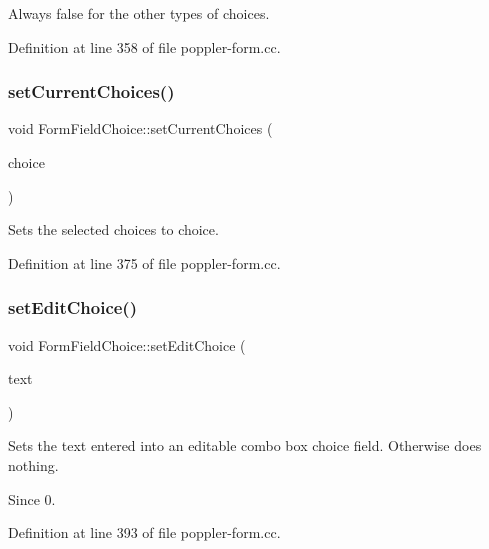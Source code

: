 Always false for the other types of choices. 

Definition at line 358 of file poppler-\/form.\+cc.

\mbox{\label{class_poppler_1_1_form_field_choice_a2817d3191458b1eb16ee017e209ca7b2}} 
\subsubsection{\texorpdfstring{set\+Current\+Choices()}{setCurrentChoices()}}
{\footnotesize\ttfamily void Form\+Field\+Choice\+::set\+Current\+Choices (\begin{DoxyParamCaption}\item[{const Q\+List$<$ int $>$ \&}]{choice }\end{DoxyParamCaption})}

Sets the selected choices to {\ttfamily choice}. 

Definition at line 375 of file poppler-\/form.\+cc.

\mbox{\label{class_poppler_1_1_form_field_choice_a4d1604d12cc73427f22e923b250532c6}} 
\subsubsection{\texorpdfstring{set\+Edit\+Choice()}{setEditChoice()}}
{\footnotesize\ttfamily void Form\+Field\+Choice\+::set\+Edit\+Choice (\begin{DoxyParamCaption}\item[{const Q\+String \&}]{text }\end{DoxyParamCaption})}

Sets the text entered into an editable combo box choice field. Otherwise does nothing.

\begin{DoxySince}{Since}
0. 
\end{DoxySince}


Definition at line 393 of file poppler-\/form.\+cc.

